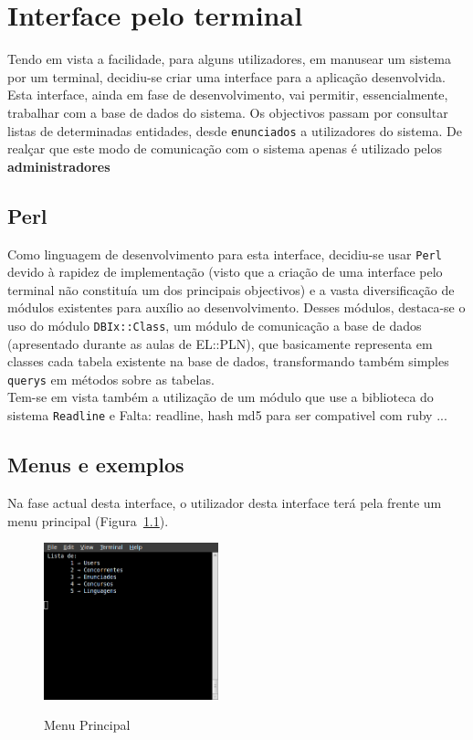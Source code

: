 \chapter{Interface pelo terminal}

Tendo em vista a facilidade, para alguns utilizadores, em manusear um sistema por um terminal, decidiu-se criar uma interface para a aplicação desenvolvida. Esta interface, 
ainda em fase de desenvolvimento, vai permitir, essencialmente, trabalhar com a base de dados do sistema. Os objectivos passam por consultar listas de determinadas entidades, 
desde \texttt{enunciados} a utilizadores do sistema. De realçar que este modo de comunicação com o sistema apenas é utilizado pelos \textbf{administradores}\\

\section{Perl}

Como linguagem de desenvolvimento para esta interface, decidiu-se usar \texttt{Perl} devido à rapidez de implementação (visto que a criação de uma interface pelo terminal não 
constituía um dos principais objectivos) e a vasta diversificação de módulos existentes para auxílio ao desenvolvimento. Desses módulos, destaca-se o uso do módulo 
\texttt{DBIx::Class}, um módulo de comunicação a base de dados (apresentado durante as aulas de EL::PLN), 
que basicamente representa em classes cada tabela existente na base de dados, transformando também simples \texttt{querys} em métodos sobre as tabelas.\\

Tem-se em vista também a utilização de um módulo que use a biblioteca do sistema \texttt{Readline} e \large{Falta: readline, hash md5 para ser compativel com ruby ...}

\section{Menus e exemplos}

Na fase actual desta interface, o utilizador desta interface terá pela frente um menu principal (Figura~\ref{img menuprinc}). \\

\begin{figure}[H]
\begin{center}
\includegraphics[width=0.45\textwidth]{Images/menuPrinc}\label{img menuprinc}
\caption{Menu Principal}
\end{center}
\end{figure} 

